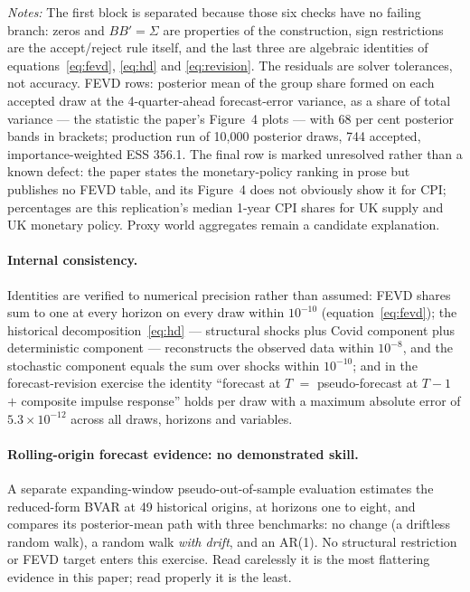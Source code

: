 \begin{table}[t]
\parbox{0.95\textwidth}{\footnotesize \emph{Notes:} The first block is separated because those six checks have no failing branch: zeros and $BB'=\Sigma$ are properties of the \citet{arias2018} construction, sign restrictions are the accept/reject rule itself, and the last three are algebraic identities of equations~\eqref{eq:fevd}, \eqref{eq:hd} and \eqref{eq:revision}. The residuals are solver tolerances, not accuracy. FEVD rows: posterior mean of the group share formed on each accepted draw at the 4-quarter-ahead forecast-error variance, as a share of total variance --- the statistic the paper's Figure~4 plots --- with 68 per cent posterior bands in brackets; production run of 10{,}000 posterior draws, 744 accepted, importance-weighted ESS 356.1. The final row is marked unresolved rather than a known defect: the paper states the monetary-policy ranking in prose but publishes no FEVD table, and its Figure~4 does not obviously show it for CPI; percentages are this replication's median 1-year CPI shares for UK supply and UK monetary policy. Proxy world aggregates remain a candidate explanation.}
\end{table}

\paragraph{Internal consistency.} Identities are verified to numerical precision rather than assumed: FEVD shares sum to one at every horizon on every draw within $10^{-10}$ (equation~\ref{eq:fevd}); the historical decomposition~\eqref{eq:hd} --- structural shocks plus Covid component plus deterministic component --- reconstructs the observed data within $10^{-8}$, and the stochastic component equals the sum over shocks within $10^{-10}$; and in the forecast-revision exercise the identity ``forecast at $T$ $=$ pseudo-forecast at $T{-}1$ $+$ composite impulse response'' holds per draw with a maximum absolute error of $5.3\times10^{-12}$ across all draws, horizons and variables.

\paragraph{Rolling-origin forecast evidence: no demonstrated skill.} A separate
expanding-window pseudo-out-of-sample evaluation estimates the reduced-form
BVAR at 49 historical origins, at horizons one to eight, and compares its
posterior-mean path with three benchmarks: no change (a driftless random walk),
a random walk \emph{with drift}, and an AR(1). No structural restriction or
FEVD target enters this exercise. Read carelessly it is the most flattering
evidence in this paper; read properly it is the least.

